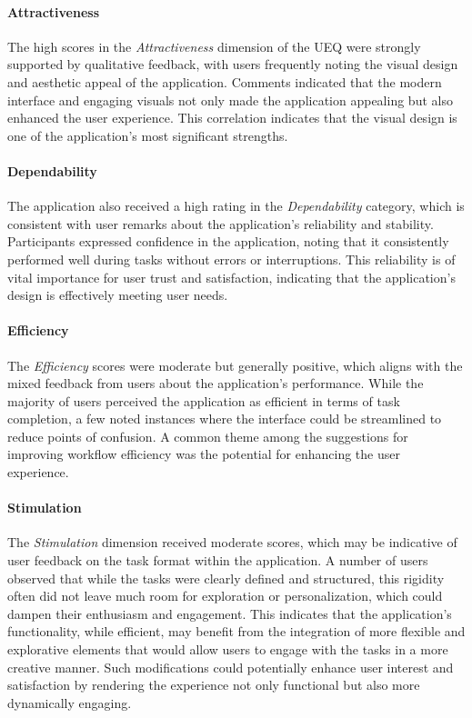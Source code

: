 \paragraph{Attractiveness}
The high scores in the \emph{Attractiveness} dimension of the UEQ were strongly supported by qualitative feedback, with users frequently noting the visual design and aesthetic appeal of the application. 
Comments indicated that the modern interface and engaging visuals not only made the application appealing but also enhanced the user experience. 
This correlation indicates that the visual design is one of the application's most significant strengths.

\paragraph{Dependability}
The application also received a high rating in the \emph{Dependability} category, which is consistent with user remarks about the application’s reliability and stability.
Participants expressed confidence in the application, noting that it consistently performed well during tasks without errors or interruptions. 
This reliability is of vital importance for user trust and satisfaction, indicating that the application’s design is effectively meeting user needs.

\paragraph{Efficiency}
The \emph{Efficiency} scores were moderate but generally positive, which aligns with the mixed feedback from users about the application's performance. 
While the majority of users perceived the application as efficient in terms of task completion, a few noted instances where the interface could be streamlined to reduce points of confusion.
A common theme among the suggestions for improving workflow efficiency was the potential for enhancing the user experience.

\paragraph{Stimulation}
The \emph{Stimulation} dimension received moderate scores, which may be indicative of user feedback on the task format within the application. 
A number of users observed that while the tasks were clearly defined and structured, this rigidity often did not leave much room for exploration or personalization, which could dampen their enthusiasm and engagement. 
This indicates that the application's functionality, while efficient, may benefit from the integration of more flexible and explorative elements that would allow users to engage with the tasks in a more creative manner. 
Such modifications could potentially enhance user interest and satisfaction by rendering the experience not only functional but also more dynamically engaging.

